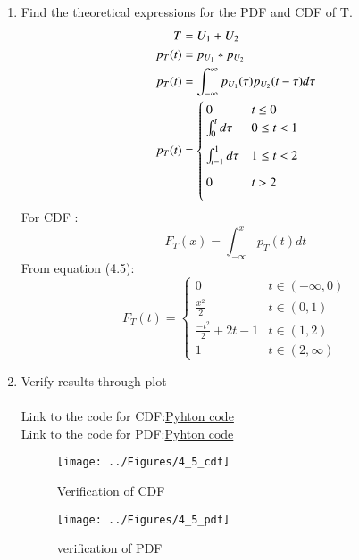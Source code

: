 \documentclass[journal,12pt,twocolumn]{IEEEtran}
\renewcommand\thesection{\arabic{section}}
\begin{document}
\begin{enumerate}[label=\thesection.\arabic*
,ref=\thesection.\theenumi]
\item Find the theoretical expressions for the PDF and CDF of T.\\
\solution 
\begin{align}
T &= U_1 + U_2 \\
p_T(t) &= p_{U_1} * p_{U_2} \\
p_T(t) &= \int_{-\infty}^{\infty} p_{U_1}(\tau)p_{U_2}(t - \tau) d \tau\\
p_T(t) &= 
\begin{cases}
0 & t \le 0\\
\vspace*{0.1in}
\int_{0}^{t} d \tau & 0 \le t < 1\\
\vspace*{0.1in}
\int_{t-1}^{1} d \tau & 1 \le t < 2\\
\vspace*{0.1in}
0 & t > 2
\end{cases}
\end{align}
For CDF :
\begin{equation}
F_T(x) = \int_{-\infty}^{x} p_T(t) dt
\end{equation}
From equation (4.5):
\begin{equation}
F_T(t) = 
\begin{cases}
0 & t \in (-\infty,0)\\
\frac{x^{2}}{2} & t \in (0,1)\\
\frac{-t^{2}}{2} + 2t -1 & t \in (1,2)\\
1 & t \in (2,\infty)
\end{cases} 
\end{equation}

\item Verify results through plot\\
\solution\\ Link to the code for CDF:\href{https://github.com/anikettsatpute/Probability-and-Random-Variable-Assignment/blob/main/code/code4_5.py}{Pyhton code}\\
 Link to the code for PDF:\href{https://github.com/anikettsatpute/Probability-and-Random-Variable-Assignment/blob/main/code/code4_5_2.py}{Pyhton code}\\
\begin{figure}[h]
\centering
\texttt{[image: ../Figures/4\_5\_cdf]}
\caption{Verification of CDF}
\label{fig:}
\end{figure}
\begin{figure}[h]
\centering
\texttt{[image: ../Figures/4\_5\_pdf]}
\caption{verification of PDF}
\label{fig:}
\end{figure}
\end{enumerate}
\newpage
\end{document}
